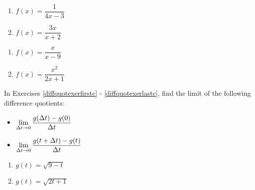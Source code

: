 \begin{multicols}{2}
\begin{enumerate}

\setcounter{enumi}{\value{HW}}

\item\label{rationaltangentfirst} $f(x) = \dfrac{1}{4x-3}$ 
\item $f(x) = \dfrac{3x}{x+2}$ 

\setcounter{HW}{\value{enumi}}
\end{enumerate}
\end{multicols}

\begin{multicols}{2}
\begin{enumerate}
\setcounter{enumi}{\value{HW}}

\item $f(x) = \dfrac{x}{x - 9}$
\item\label{rationaltangentlast} $f(x) = \dfrac{x^2}{2x+1}$ 

\setcounter{HW}{\value{enumi}}
\end{enumerate}
\end{multicols}

In Exercises \ref{diffquotexerfirstc} - \ref{diffquotexerlastc},  find the limit of the following difference quotients:

\begin{multicols}{2}

\begin{itemize}

\item  $\displaystyle{\lim_{\Delta t \rightarrow 0} \dfrac{g(\Delta t) - g(0)}{\Delta t}}$

\item  $\displaystyle{\lim_{\Delta t \rightarrow 0} \dfrac{g(t+\Delta t) - g(t)}{\Delta t}}$

\end{itemize}

\end{multicols}


\begin{multicols}{2}
\begin{enumerate}
\setcounter{enumi}{\value{HW}}

\item  $g(t) = \sqrt{9-t}$  \label{diffquotexerfirstc}
\item  $g(t) = \sqrt{2t+1}$   \label{diffquotexerlastc}


\setcounter{HW}{\value{enumi}}
\end{enumerate}
\end{multicols}

